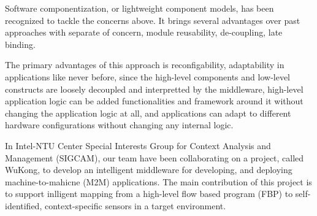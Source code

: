Software componentization, or lightweight component models, has been recognized to
tackle the concerns above. It brings several advantages over past
approaches with separate of concern, module reusability, de-coupling, late
binding.

The primary advantages of this approach is reconfigability, adaptability in 
applications like never before, since the high-level components and
low-level constructs are loosely decoupled and interpretted by the middleware, 
high-level application logic can be added functionalities and framework around
it without changing the application logic at all, and applications can adapt to
different hardware configurations without changing any internal logic.

In Intel-NTU Center Special Interests Group for Context Analysis and Management 
(SIGCAM), our team have been collaborating on a project, called WuKong, to develop 
an intelligent middleware for developing, and deploying machine-to-mahicne 
(M2M) applications. The main contribution of this project is to support
inlligent mapping from a high-level flow based program (FBP) to
self-identified, context-specific sensors in a target
environment\cite{Reijers}.






